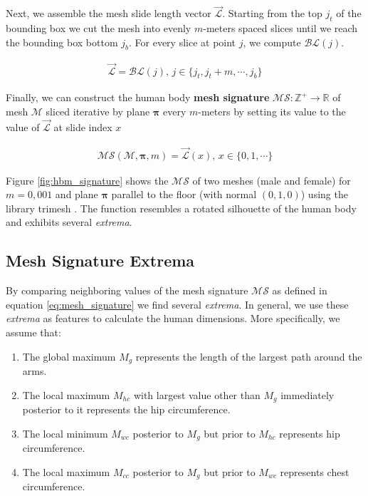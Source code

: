 \documentclass[10pt,twocolumn,letterpaper]{article}
\begin{document}
Next, we assemble the mesh slide length vector $\vec{\mathcal{L}}$. Starting 
from the 
top $j_t$ of the bounding box we cut the mesh into 
evenly 
$m$-meters spaced slices until we reach the bounding box bottom $j_b$. For 
every 
slice at point $j$, we compute $\mathcal{BL}(j)$.

\begin{align}
\vec{\mathcal{L}} = \mathcal{BL}(j), \, j 
\in 
\{j_t, j_t+m, \cdots, j_b\}
\end{align}

Finally, we can construct the human body \textbf{mesh signature} $\mathcal{MS}: 
\mathbb{Z}^+ \to \mathbb{R}$ of mesh $\mathcal{M}$ sliced iterative by plane 
$\boldsymbol{\pi}$ every $m$-meters by setting its value to the value of 
$\vec{\mathcal{L}}$ at 
slide index $x$

\begin{align}\label{eq:mesh_signature}
\mathcal{MS}(\mathcal{M}, \boldsymbol{\pi}, m) = \vec{\mathcal{L}}(x), \, x \in 
\{0, 1, \cdots\}
\end{align}

Figure \ref{fig:hbm_signature} shows the $\mathcal{MS}$ of two meshes (male 
and female) for 
$m=0,001$ and plane $\boldsymbol{\pi}$ parallel to the floor (with normal $(0, 
1,0)$) using the library trimesh \cite{trimesh}. The 
function resembles a rotated silhouette of the human body and exhibits several 
\textit{extrema}.

\subsection{Mesh Signature Extrema}

By comparing neighboring values of the mesh signature $\mathcal{MS}$ as defined 
in equation \ref{eq:mesh_signature} we find several \textit{extrema}. In 
general, we use these \textit{extrema} as features to 
calculate the human dimensions. More specifically, we assume that:
\begin{enumerate}
	\item The global maximum $M_g$ represents the length of the largest path 
	around the arms.
	\item The local maximum $M_{hc}$ with largest value other than $M_g$ 
	immediately posterior to it represents the hip circumference.
	\item The local minimum $M_{wc}$ posterior to $M_g$ but prior to $M_{hc}$ 
	represents hip circumference.
	\item The local maximum $M_{cc}$ posterior to $M_g$ but prior to $M_{wc}$ 
	represents chest circumference.
\end{enumerate}
\end{document}
